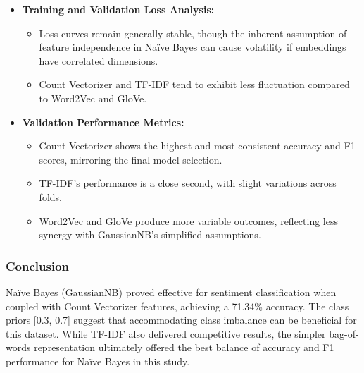 \begin{itemize}
    \item \textbf{Training and Validation Loss Analysis:}
    \begin{itemize}
        \item Loss curves remain generally stable, though the inherent assumption of feature independence in Naïve Bayes can cause volatility if embeddings have correlated dimensions.
        \item Count Vectorizer and TF-IDF tend to exhibit less fluctuation compared to Word2Vec and GloVe.
    \end{itemize}
    
    \item \textbf{Validation Performance Metrics:}
    \begin{itemize}
        \item Count Vectorizer shows the highest and most consistent accuracy and F1 scores, mirroring the final model selection.
        \item TF-IDF’s performance is a close second, with slight variations across folds.
        \item Word2Vec and GloVe produce more variable outcomes, reflecting less synergy with GaussianNB’s simplified assumptions.
    \end{itemize}
\end{itemize}

\subsubsection{Conclusion}

Naïve Bayes (GaussianNB) proved effective for sentiment classification when coupled with Count Vectorizer features, achieving a 71.34\% accuracy. The class priors [0.3, 0.7] suggest that accommodating class imbalance can be beneficial for this dataset. While TF-IDF also delivered competitive results, the simpler bag-of-words representation ultimately offered the best balance of accuracy and F1 performance for Naïve Bayes in this study.

